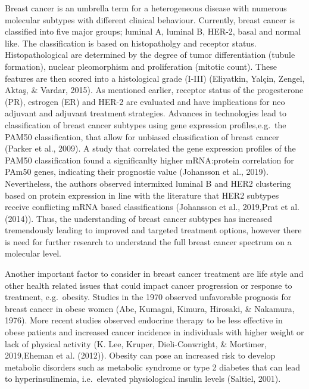 \documentclass[12pt,openany]{book}
\begin{document}
Breast cancer is an umbrella term for a heterogeneous disease with
numerous molecular subtypes with different clinical behaviour.
Currently, breast cancer is classified into five major groups; luminal
A, luminal B, HER-2, basal and normal like. The classification is based
on histopatholgy and receptor status. Histopathological are determined
by the degree of tumor differentiation (tubule formation), nuclear
pleomorphism and proliferation (mitotic count). These features are then
scored into a histological grade (I-III) (Eliyatkin, Yalçin, Zengel,
Aktaş, \& Vardar, 2015). As mentioned earlier, receptor status of the
progesterone (PR), estrogen (ER) and HER-2 are evaluated and have
implications for neo adjuvant and adjuvant treatment strategies.
Advances in technologies lead to classification of breast cancer
subtypes using gene expression profiles,e.g.~the PAM50 classification,
that allow for unbiased classification of breast cancer (Parker et al.,
2009). A study that correlated the gene expression profiles of the PAM50
classification found a significanlty higher mRNA:protein correlation for
PAm50 genes, indicating their prognostic value (Johansson et al., 2019).
Nevertheless, the authors observed intermixed luminal B and HER2
clustering based on protein expression in line with the literature that
HER2 subtypes receive conflicting mRNA based classifications (Johansson
et al., 2019,Prat et al. (2014)). Thus, the understanding of breast
cancer subtypes has increased tremendously leading to improved and
targeted treatment options, however there is need for further research
to understand the full breast cancer spectrum on a molecular level.

Another important factor to consider in breast cancer treatment are life
style and other health related issues that could impact cancer
progression or response to treatment, e.g.~obesity. Studies in the 1970
observed unfavorable prognosis for breast cancer in obese women (Abe,
Kumagai, Kimura, Hirosaki, \& Nakamura, 1976). More recent studies
observed endocrine therapy to be less effective in obese patients and
increased cancer incidence in individuals with higher weight or lack of
physical activity (K. Lee, Kruper, Dieli-Conwright, \& Mortimer,
2019,Eheman et al. (2012)). Obesity can pose an increased risk to
develop metabolic disorders such as metabolic syndrome or type 2
diabetes that can lead to hyperinsulinemia, i.e.~elevated physiological
insulin levels (Saltiel, 2001).
\end{document}
